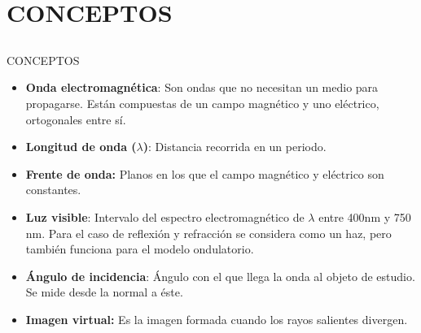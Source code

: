 
\section{CONCEPTOS}
\subsection{}

\begin{frame}{CONCEPTOS}
  \begin{itemize}
    \item \textbf{Onda electromagnética}: Son ondas que no necesitan un medio para propagarse. Están compuestas de un campo magnético y uno eléctrico, ortogonales entre sí.
    \item \textbf{Longitud de onda (\boldmath$\lambda$)}: Distancia recorrida en un periodo.
    \item \textbf{Frente de onda:} Planos en los que el campo magnético y eléctrico son constantes.
    \item \textbf{Luz visible}: Intervalo del espectro electromagnético de $\lambda$ entre 400nm y 750 nm. Para el caso de reflexión y refracción se considera como un haz, pero también funciona para el modelo ondulatorio.
    \item \textbf{Ángulo de incidencia}: Ángulo con el que llega la onda al objeto de estudio. Se mide desde la normal a éste.
    \item \textbf{Imagen virtual:} Es la imagen formada cuando los rayos salientes divergen.
  \end{itemize}
\end{frame}
